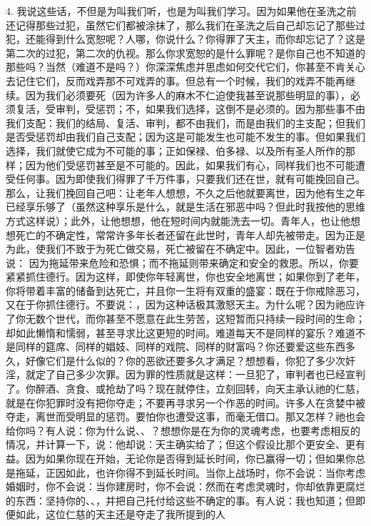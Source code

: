 4. 我说这些话，不但是为叫我们听，也是为叫我们学习。因为如果他在圣洗之前还记得那些过犯，虽然它们都被涂抹了，那么我们在圣洗之后自己却忘记了那些过犯，还能得到什么宽恕呢？人哪，你说什么？你得罪了天主，而你却忘记了？这是第二次的过犯，第二次的仇视。那么你求宽恕的是什么罪呢？是你自己也不知道的那些吗？当然（难道不是吗？）你深深焦虑并思虑如何交代它们，你甚至不肯关心去记住它们，反而戏弄那不可戏弄的事。但总有一个时候，我们的戏弄不能再继续。因为我们必须要死（因为许多人的麻木不仁迫使我甚至说那些明显的事），必须复活，受审判，受惩罚；不，如果我们选择，这倒不是必须的。因为那些事不由我们支配：我们的结局、复活、审判，都不由我们，而是由我们的主支配；但我们是否受惩罚却由我们自己支配；因为这是可能发生也可能不发生的事。但如果我们选择，我们就使它成为不可能的事；正如保禄、伯多禄、以及所有圣人所作的那样；因为他们受惩罚甚至是不可能的。因此，如果我们有心，同样我们也不可能遭受任何事。因为即使我们得罪了千万件事，只要我们还在世，就有可能挽回自己。那么，让我们挽回自己吧：让老年人想想，不久之后他就要离世，因为他有生之年已经享乐够了（虽然这种享乐是什么，就是生活在邪恶中吗？但此时我按他的思维方式这样说）；此外，让他想想，他在短时间内就能洗去一切。青年人，也让他想想死亡的不确定性，常常许多年长者还留在此世时，青年人却先被带走。因为正是为此，使我们不致于为死亡做交易，死亡被留在不确定中。因此，一位智者劝告说： 因为拖延带来危险和恐惧；而不拖延则带来确定和安全的救恩。所以，你要紧紧抓住德行。因为这样，即使你年轻离世，你也安全地离世；如果你到了老年，你将带着丰富的储备到达死亡，并且你一生将有双重的盛宴：既在于你戒除恶习，又在于你抓住德行。不要说：，因为这种话极其激怒天主。为什么呢？因为祂应许了你无数个世代，而你甚至不愿意在此生劳苦，这短暂而只持续一段时间的生命；却如此懒惰和懦弱，甚至寻求比这更短的时间。难道每天不是同样的宴乐？难道不是同样的筵席、同样的娼妓、同样的戏院、同样的财富吗？你还要爱这些东西多久，好像它们是什么似的？你的恶欲还要多久才满足？想想看，你犯了多少次奸淫，就定了自己多少次罪。因为罪的性质就是这样：一旦犯了，审判者也已经宣判了。你醉酒、贪食、或抢劫了吗？现在就停住，立刻回转，向天主承认祂的仁慈，就是在你犯罪时没有把你夺走；不要再寻求另一个作恶的时间。许多人在贪婪中被夺走，离世而受明显的惩罚。要怕你也遭受这事，而毫无借口。那又怎样？祂也会给你吗？有人说：你为什么说、、？想想你是在为你的灵魂考虑，也要考虑相反的情况，并计算一下，说：他却说：天主确实给了；但这个假设比那个更安全、更有益。因为如果你现在开始，无论你是否得到延长时间，你已赢得一切；但如果你总是拖延，正因如此，也许你得不到延长时间。当你上战场时，你不会说：当你考虑婚姻时，你不会说：当你建房时，你不会说：然而在考虑灵魂时，你却依靠更腐烂的东西：坚持你的、、，并把自己托付给这些不确定的事。有人说：我也知道；但即便如此，这位仁慈的天主还是夺走了我所提到的人